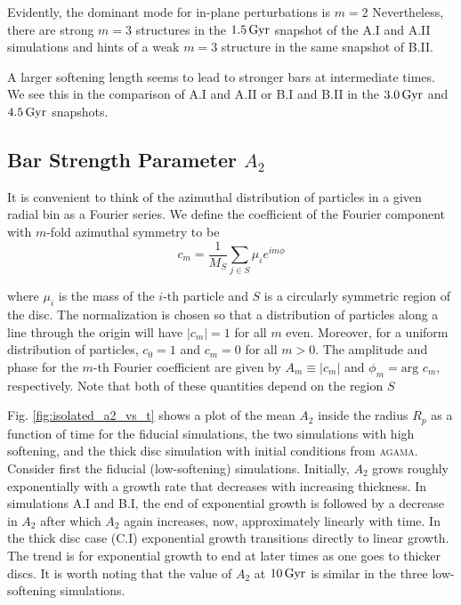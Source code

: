 Evidently, the dominant mode for in-plane perturbations is $m=2$
Nevertheless, there are strong $m=3$ structures in the $1.5\,{\rm
  Gyr}$ snapshot of the A.I and A.II simulations and hints of a weak
$m=3$ structure in the same snapshot of B.II.

A larger softening length seems to lead to stronger bars at
intermediate times.  We see this in the comparison of A.I and A.II or
B.I and B.II in the $3.0\,{\rm Gyr}$ and $4.5\,{\rm Gyr}$ snapshots.

\subsection{Bar Strength Parameter $A_2$}

It is convenient to think of the azimuthal distribution of particles
in a given radial bin as a Fourier series.  We define the coefficient
of the Fourier component with $m$-fold azimuthal symmetry to be
\begin{equation}\label{eq:cm}
c_m =  \frac{1}{M_S} \sum_{j \in S} \mu_i e^{i m \phi}
\end{equation}

\noindent where $\mu_i$ is the mass of the $i$-th particle and $S$ is
a circularly symmetric region of the disc.  The normalization is
chosen so that a distribution of particles along a line through the
origin will have $|c_m|=1$ for all $m$ even.  Moreover, for a uniform
distribution of particles, $c_0=1$ and $c_m=0$ for all $m>0$.  The
amplitude and phase for the $m$-th Fourier coefficient are given by
$A_m \equiv \vert c_m \vert$ and $\phi_m = \text{arg } c_m$,
respectively.  Note that both of these quantities depend on the region
$S$

Fig. \ref{fig:isolated_a2_vs_t} shows a plot of the mean $A_2$ inside
the radius $R_p$ as a function of time for the fiducial simulations,
the two simulations with high softening, and the thick disc simulation
with initial conditions from \textsc{agama}.  Consider first the
fiducial (low-softening) simulations.  Initially, $A_2$ grows roughly
exponentially with a growth rate that decreases with increasing
thickness.  In simulations A.I and B.I, the end of exponential growth
is followed by a decrease in $A_2$ after which $A_2$ again increases,
now, approximately linearly with time.  In the thick disc case (C.I)
exponential growth transitions directly to linear growth.  The trend
is for exponential growth to end at later times as one goes to thicker
discs.  It is worth noting that the value of $A_2$ at $10\,{\rm Gyr}$
is similar in the three low-softening simulations.

